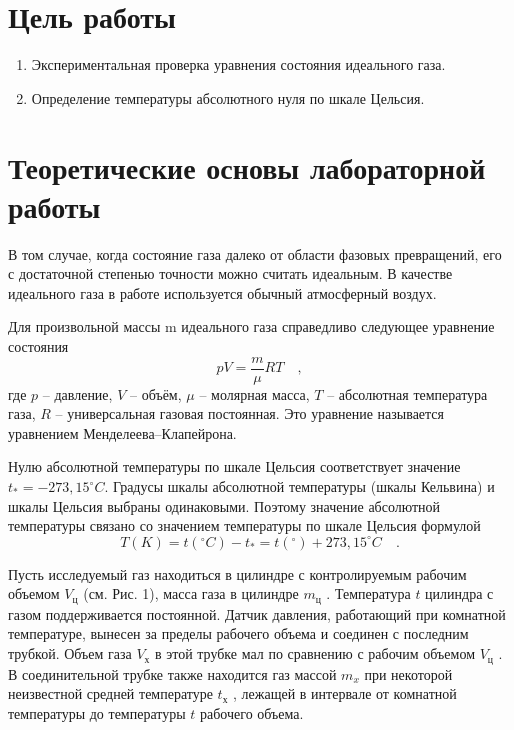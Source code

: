 \documentclass[11pt,a4paper]{article}
\begin{document}
	\setcounter{page}{2}
	\tableofcontents
	\newpage
	\section{Цель работы}
	\begin{enumerate}
		\item Экспериментальная проверка уравнения состояния идеального газа.
		\item Определение температуры абсолютного нуля по шкале Цельсия.
	\end{enumerate}
    \section{Теоретические основы лабораторной работы}
    В том случае, когда состояние газа далеко от области фазовых превращений, его с
    достаточной степенью точности можно считать идеальным. В качестве идеального газа в работе
    используется обычный атмосферный воздух.
    
    Для произвольной массы m идеального газа справедливо следующее уравнение состояния
    \begin{equation}
    	pV = \frac{m}{\mu}RT \quad ,
    \end{equation}
    где $ p $ -- давление, $ V $ -- объём, $ \mu $ -- молярная масса, $ T$ -- абсолютная температура газа, $ R $ --
    универсальная газовая постоянная. Это уравнение называется уравнением Менделеева--Клапейрона.
    
    Нулю абсолютной температуры по шкале Цельсия соответствует значение $ t_* = -273,15 ^\circ C$.
    Градусы шкалы абсолютной температуры (шкалы Кельвина) и шкалы Цельсия выбраны
    одинаковыми. Поэтому значение абсолютной температуры связано со значением температуры
    по шкале Цельсия формулой
    \begin{equation}
    	T(K) = t(^\circ C) - t_* = t(^\circ) + 273,15^\circ C \quad .
    \end{equation}
    
Пусть исследуемый газ находиться в цилиндре с контролируемым рабочим объемом $V_ц$ (см.
Рис. 1), масса газа в цилиндре $m_ц$ . Температура $t$ цилиндра с газом поддерживается постоянной. Датчик давления, работающий при комнатной температуре, вынесен за пределы рабочего объема и соединен с последним трубкой. Объем газа $V_х$ в этой трубке мал по сравнению с рабочим объемом $V_ц$ . В соединительной трубке также находится газ массой $m_x$ при некоторой неизвестной средней температуре $t_х$ , лежащей в интервале от комнатной температуры до температуры $t$ рабочего объема.
\end{document}
